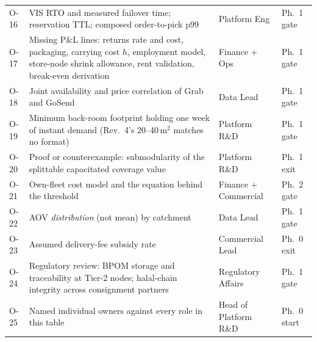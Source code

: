 \begin{table}[t]
\begin{tabular}{@{}p{0.5cm}p{4.0cm}p{1.5cm}p{1.0cm}@{}}
O-16 & VIS RTO and measured failover time; reservation TTL; composed order-to-pick p99 & Platform Eng & Ph.\ 1 gate\\
O-17 & Missing P\&L lines: returns rate and cost, packaging, carrying cost $h$, employment model, store-node shrink allowance, rent validation, break-even derivation & Finance + Ops & Ph.\ 1 gate\\
O-18 & Joint availability and price correlation of Grab and GoSend & Data Lead & Ph.\ 1 gate\\
O-19 & Minimum back-room footprint holding one week of instant demand (Rev.~4's 20--40\,m$^2$ matches no format) & Platform R\&D & Ph.\ 1 gate\\
O-20 & Proof or counterexample: submodularity of the splittable capacitated coverage value & Platform R\&D & Ph.\ 1 exit\\
O-21 & Own-fleet cost model and the equation behind the threshold & Finance + Commercial & Ph.\ 2 gate\\
O-22 & AOV \emph{distribution} (not mean) by catchment & Data Lead & Ph.\ 1 gate\\
O-23 & Assumed delivery-fee subsidy rate & Commercial Lead & Ph.\ 0 exit\\
O-24 & Regulatory review: BPOM storage and traceability at Tier-2 nodes; halal-chain integrity across consignment partners & Regulatory Affairs & Ph.\ 1 gate\\
O-25 & Named individual owners against every role in this table & Head of Platform R\&D & Ph.\ 0 start\\
\bottomrule
\end{tabular}
\end{table}
